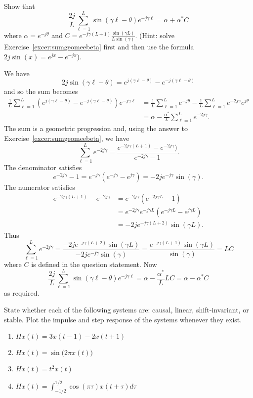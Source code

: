 \begin{excersizelist}
\item \label{excer:sumsinegeomean} Show that 
\[
\frac{2j}{L}\sum_{\ell=1}^{L}\sin( \gamma \ell - \theta)  e^{-j \gamma \ell} = \alpha + \alpha^*C
\]
where $\alpha = e^{-j\theta}$ and $C = e^{-j\gamma (L+1)}\frac{\sin(\gamma L)}{L\sin(\gamma)}$. (Hint: solve Exercise~\ref{excer:sumgeomeebeta} first and then use the formula $2j\sin(x) = e^{jx} -  e^{-jx}$).
\begin{solution}
We have 
\[
2j\sin(\gamma \ell - \theta) = e^{j(\gamma \ell - \theta)} -  e^{-j(\gamma \ell - \theta)}
\]
and so the sum becomes
\begin{align*}
\frac{1}{L}\sum_{\ell=1}^{L}(e^{j(\gamma \ell - \theta)} - e^{-j(\gamma \ell - \theta)})  e^{-j \gamma \ell} &= \frac{1}{L}\sum_{\ell=1}^{L}e^{-j\theta} - \frac{1}{L}\sum_{\ell=1}^{L}e^{-2j\gamma}e^{j\theta} \\
&= \alpha - \frac{\alpha^*}{L}\sum_{\ell=1}^{L}e^{-2j\gamma}.
\end{align*}
The sum is a geometric progression and, using the answer to Exercise~\ref{excer:sumgeomeebeta}, we have
\[
\sum_{\ell=1}^{L}e^{-2j\gamma} = \frac{e^{-2j\gamma (L+1)} - e^{-2j\gamma})}{e^{-2j\gamma} - 1}.
\]
The denominator satisfies
\[
e^{-2j\gamma} - 1 = e^{-j\gamma}(e^{-j\gamma} - e^{j\gamma}) = -2 j e^{-j\gamma} \sin(\gamma). 
\]
The numerator satisfies
\begin{align*}
e^{-2j\gamma (L+1)} - e^{-2j\gamma} &= e^{-2j\gamma}(e^{-2j\gamma L} - 1) \\
&= e^{-2j\gamma}e^{-j\gamma L} (e^{-j\gamma L} - e^{j\gamma L}) \\
&= -2 j e^{-j\gamma(L+2)} \sin(\gamma L).
\end{align*}
Thus
\[
\sum_{\ell=1}^{L}e^{-2j\gamma} = \frac{-2 j e^{-j\gamma(L+2)} \sin(\gamma L)}{-2 j e^{-j\gamma} \sin(\gamma)} = \frac{e^{-j\gamma(L+1)} \sin(\gamma L)}{ \sin(\gamma)} = L C
\]
where $C$ is defined in the question statement.  Now
\[
\frac{2j}{L}\sum_{\ell=1}^{L}\sin( \gamma \ell - \theta)  e^{-j \gamma \ell} = \alpha - \frac{\alpha^*}{L}LC = \alpha - \alpha^*C
\]
as required.
\end{solution}

\item State whether each of the following systems are: causal, linear, shift-invariant, or stable.  Plot the impulse and step response of the systems whenever they exist.
\begin{enumerate}
\item $Hx(t) = 3x(t - 1) - 2x(t+1)$
\item $Hx(t) = \sin\big(2\pi x(t)\big)$
\item $Hx(t) = t^2 x(t)$
\item $Hx(t) = \int_{-1/2}^{1/2} \cos(\pi\tau) x(t + \tau) d\tau$
\end{enumerate}


\end{excersizelist}
